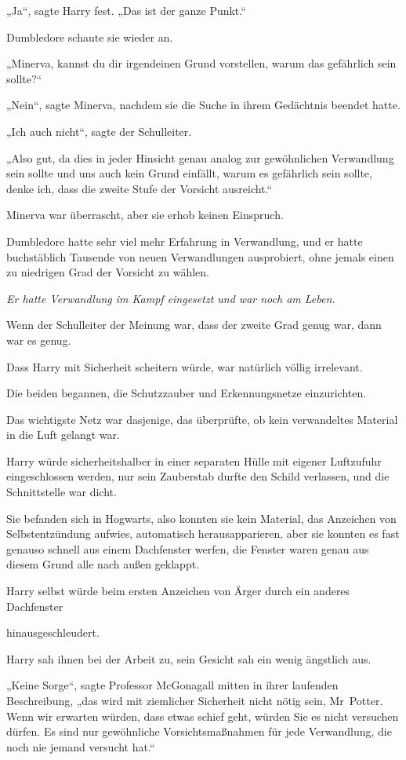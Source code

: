 {„Ja“, sagte Harry fest. „Das ist der ganze Punkt.“

Dumbledore schaute sie wieder an.

„Minerva, kannst du dir irgendeinen Grund vorstellen, warum das gefährlich sein sollte?“

„Nein“, sagte Minerva, nachdem sie die Suche in ihrem Gedächtnis beendet hatte.

„Ich auch nicht“, sagte der Schulleiter.

„Also gut, da dies in jeder Hinsicht genau analog zur gewöhnlichen Verwandlung sein sollte und uns auch kein Grund einfällt, warum es gefährlich sein sollte, denke ich, dass die zweite Stufe der Vorsicht ausreicht.“

Minerva war überrascht, aber sie erhob keinen Einspruch.

Dumbledore hatte sehr viel mehr Erfahrung in Verwandlung, und er hatte buchstäblich Tausende von neuen Verwandlungen ausprobiert, ohne jemals einen zu niedrigen Grad der Vorsicht zu wählen.

\emph{Er hatte Verwandlung im Kampf eingesetzt und war noch am Leben.}

Wenn der Schulleiter der Meinung war, dass der zweite Grad genug war, dann war es genug.

Dass Harry mit Sicherheit scheitern würde, war natürlich völlig irrelevant.

Die beiden begannen, die Schutzzauber und Erkennungsnetze einzurichten.

Das wichtigste Netz war dasjenige, das überprüfte, ob kein verwandeltes Material in die Luft gelangt war.

Harry würde sicherheitshalber in einer separaten Hülle mit eigener Luftzufuhr eingeschlossen werden, nur sein Zauberstab durfte den Schild verlassen, und die Schnittstelle war dicht.

Sie befanden sich in Hogwarts, also konnten sie kein Material, das Anzeichen von Selbstentzündung aufwies, automatisch herausapparieren, aber sie konnten es fast genauso schnell aus einem Dachfenster werfen, die Fenster waren genau aus diesem Grund alle nach außen geklappt.

Harry selbst würde beim ersten Anzeichen von Ärger durch ein anderes Dachfenster

hinausgeschleudert.

Harry sah ihnen bei der Arbeit zu, sein Gesicht sah ein wenig ängstlich aus.

„Keine Sorge“, sagte Professor McGonagall mitten in ihrer laufenden Beschreibung, „das wird mit ziemlicher Sicherheit nicht nötig sein, Mr~Potter. Wenn wir erwarten würden, dass etwas schief geht, würden Sie es nicht versuchen dürfen. Es sind nur gewöhnliche Vorsichtsmaßnahmen für jede Verwandlung, die noch nie jemand versucht hat.“

}
